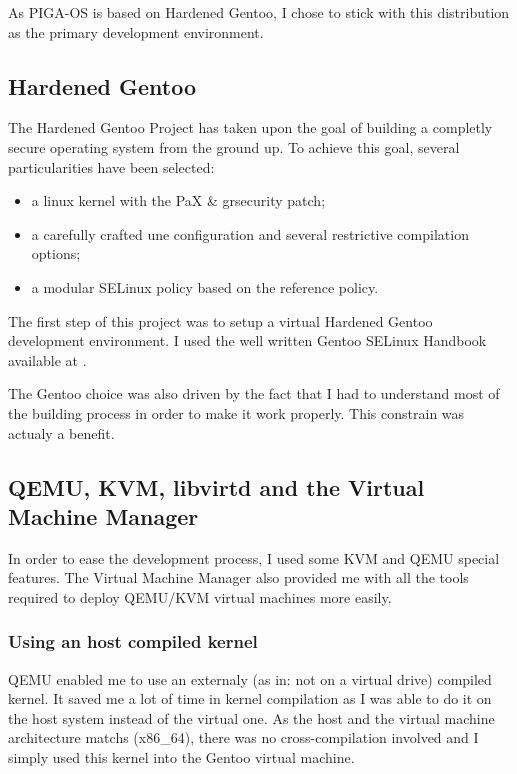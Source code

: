 \documentclass[pdftex,a4paper,titlepage,11pt]{article}
\begin{document}
\smallskip

As PIGA-OS is based on Hardened Gentoo, I chose to stick with this distribution
as the primary development environment.

\subsection{Hardened Gentoo}

The Hardened Gentoo Project has taken upon the goal of building a completly
secure operating system from the ground up. To achieve this goal, several
particularities have been selected:
\begin{itemize}
	\item a linux kernel with the PaX \& grsecurity patch;
	\item a carefully crafted une configuration and several restrictive
compilation options;
	\item a modular SELinux policy based on the reference policy.
\end{itemize}

\smallskip

The first step of this project was to setup a virtual Hardened Gentoo
development environment. I used the well written Gentoo SELinux Handbook
available at \cite{GSELH}.

\bigskip

The Gentoo choice was also driven by the fact that I had to understand most of
the building process in order to make it work properly. This constrain was
actualy a benefit.

\subsection{QEMU, KVM, libvirtd and the Virtual Machine Manager}

In order to ease the development process, I used some KVM and QEMU special
features. The Virtual Machine Manager also provided me with all the tools
required to deploy QEMU/KVM virtual machines more easily.

\subsubsection{Using an host compiled kernel}

QEMU enabled me to use an externaly (as in: not on a virtual drive) compiled
kernel. It saved me a lot of time in kernel compilation as I was able to do it
on the host system instead of the virtual one. As the host and the virtual
machine architecture matchs (x86\_64), there was no cross-compilation involved
and I simply used this kernel into the Gentoo virtual machine.
\end{document}
